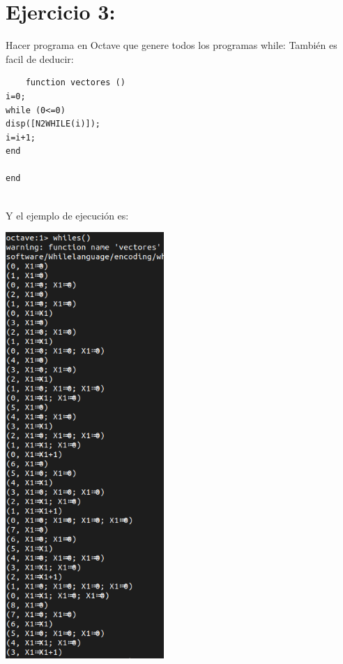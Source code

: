 \documentclass[12pt]{article}
\begin{document}
\section*{Ejercicio 3:}
Hacer programa en Octave que genere todos los programas while:
También es facil de deducir:
\begin{verbatim}
    function vectores ()
i=0;
while (0<=0)
disp([N2WHILE(i)]);
i=i+1;
end

end
\end{verbatim}
\\ Y el ejemplo de ejecución es:
\begin{center}
\includegraphics[width=6cm]{whiles.png}
\end{center}
\end{document}
